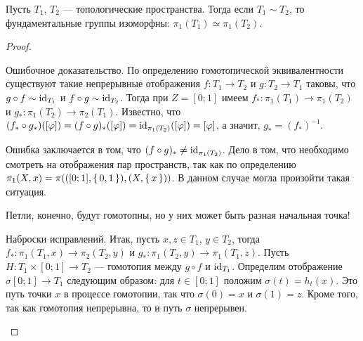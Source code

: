 \documentclass[main]{subfiles}
\begin{document}
\begin{theorem}
	Пусть $ T_1 $, $ T_2 $ --- топологические пространства. Тогда если $ T_1 \sim T_2 $, то фундаментальные группы
	изоморфны: $ \pi_1(T_1) \simeq \pi_1(T_2) $.
\end{theorem}

\begin{proof} \leavevmode
	\begin{phased}
		\item[Ошибочное доказательство.] По определению гомотопической эквивалентности существуют такие
			непрерывные отображения $ f \colon T_1 \to T_2 $ и $ g \colon T_2 \to T_1 $ таковы,
			что $ g \circ f \sim \operatorname{id}_{T_1} $ и $ f \circ g \sim \operatorname{id}_{T_2} $. Тогда при $ Z = [0; 1] $ имеем
			$ f_* \colon \pi_1(T_1) \to \pi_1(T_2) $ и $ g_* \colon \pi_1(T_2) \to \pi_2(T_1) $. Известно,
			что $ (f_* \circ g_*)([\varphi]) = (f \circ g)_*([\varphi]) = \operatorname{id}_{\pi_1(T_2)}([\varphi]) = [\varphi] $, а значит,
			$ g_* = (f_*)^{-1} $.

			Ошибка заключается в том, что $ (f \circ g)_* \neq \operatorname{id}_{\pi_1(T_2)} $. Дело
			в том, что необходимо смотреть на отображения пар пространств, так как по определению
			$ \pi_1(X, x) = \pi(([0; 1], \left\{\,0, 1\,\right\}), (X, \left\{\,x\,\right\})) $. В данном случае могла произойти такая ситуация.

			Петли, конечно, будут гомотопны, но у них может быть разная начальная точка!
		\item[Наброски исправлений.] Итак, пусть $ x, z \in T_1 $, $ y \in T_2 $, тогда
			$ f_* \colon \pi_1(T_1, x) \to \pi_2(T_2, y) $ и $ g_* \colon \pi_1(T_2, y) \to \pi_1(T_1, z) $.
			Пусть $ H \colon T_1 \times [0;1] \to T_2 $ --- гомотопия между $ g \circ f $ и $ \operatorname{id}_{T_1} $.
			Определим отображение $ \sigma [0; 1] \to T_1 $ следующим образом: для $ t \in [0; 1] $ положим
			$ \sigma(t) = h_t(x) $. Это путь точки $ x $ в процессе гомотопии, так что $ \sigma(0) = x $ и
			$ \sigma(1) = z $. Кроме того, так как гомотопия непрерывна, то и путь $ \sigma $ непрерывен.


\end{phased}
\end{proof}
\end{document}
